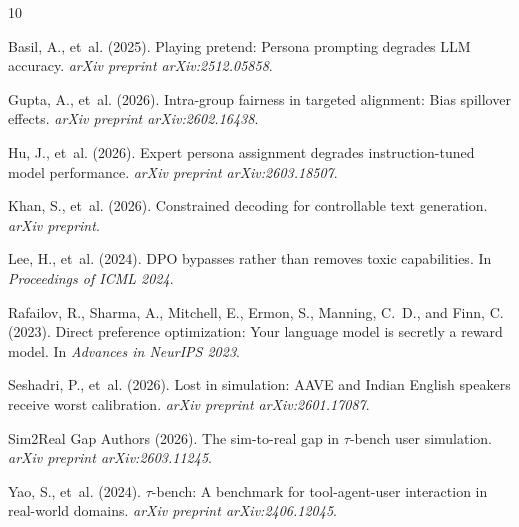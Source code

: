 \documentclass[11pt,a4paper]{article}
\begin{document}
\begin{thebibliography}{10}

Basil, A., et~al. (2025).
\newblock Playing pretend: Persona prompting degrades LLM accuracy.
\newblock \emph{arXiv preprint arXiv:2512.05858}.

Gupta, A., et~al. (2026).
\newblock Intra-group fairness in targeted alignment: Bias spillover effects.
\newblock \emph{arXiv preprint arXiv:2602.16438}.

Hu, J., et~al. (2026).
\newblock Expert persona assignment degrades instruction-tuned model performance.
\newblock \emph{arXiv preprint arXiv:2603.18507}.

Khan, S., et~al. (2026).
\newblock Constrained decoding for controllable text generation.
\newblock \emph{arXiv preprint}.

Lee, H., et~al. (2024).
\newblock DPO bypasses rather than removes toxic capabilities.
\newblock In \emph{Proceedings of ICML 2024}.

Rafailov, R., Sharma, A., Mitchell, E., Ermon, S., Manning, C.~D., and Finn, C. (2023).
\newblock Direct preference optimization: Your language model is secretly a reward model.
\newblock In \emph{Advances in NeurIPS 2023}.

Seshadri, P., et~al. (2026).
\newblock Lost in simulation: AAVE and Indian English speakers receive worst calibration.
\newblock \emph{arXiv preprint arXiv:2601.17087}.

{Sim2Real Gap Authors} (2026).
\newblock The sim-to-real gap in $\tau$-bench user simulation.
\newblock \emph{arXiv preprint arXiv:2603.11245}.

Yao, S., et~al. (2024).
\newblock $\tau$-bench: A benchmark for tool-agent-user interaction in real-world domains.
\newblock \emph{arXiv preprint arXiv:2406.12045}.

\end{thebibliography}
\end{document}
